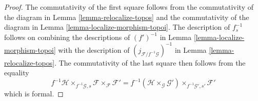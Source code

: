 \documentclass[10pt,a4paper]{amsart}
\theoremstyle{plain}
\theoremstyle{definition}
\theoremstyle{remark}
\numberwithin{equation}{subsection}
\begin{document}
\begin{proof}
The commutativity of the first square follows from the commutativity of
the diagram in
Lemma \ref{lemma-relocalize-topos}
and the commutativity of the diagram in
Lemma \ref{lemma-localize-morphism-topoi}.
The description of $f_s^{-1}$ follows on combining the descriptions
of $(f')^{-1}$ in
Lemma \ref{lemma-localize-morphism-topoi}
with the description of
$(j_{\mathcal{F}/f^{-1}\mathcal{G}})^{-1}$ in
Lemma \ref{lemma-relocalize-topos}.
The commutativity of the last square then follows from the
equality
$$
f^{-1}\mathcal{H} \times_{f^{-1}\mathcal{G}, s} \mathcal{F}
\times_\mathcal{F} \mathcal{F}'
=
f^{-1}(\mathcal{H} \times_\mathcal{G} \mathcal{G}')
\times_{f^{-1}\mathcal{G}', s'} \mathcal{F}'
$$
which is formal.
\end{proof}
\end{document}
